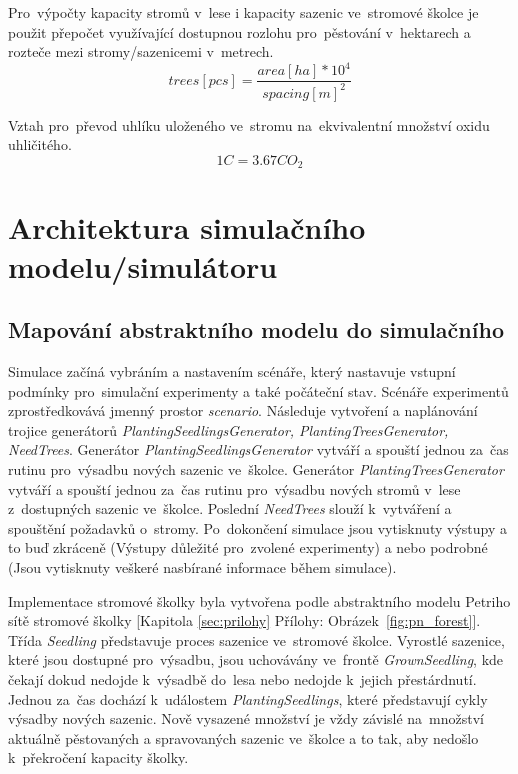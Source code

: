 \documentclass[a4paper, 11pt, titlepage]{article}
\begin{document}
Pro~výpočty kapacity stromů v~lese i kapacity sazenic ve~stromové školce je použit přepočet využívající dostupnou rozlohu pro~pěstování v~hektarech a rozteče mezi stromy/sazenicemi v~metrech.
$$trees[pcs]=\frac{area[ha]*10^4}{spacing[m]^2}$$

Vztah pro~převod uhlíku uloženého ve~stromu na~ekvivalentní množství oxidu uhličitého.\cite{Growing_Tree_in_UK}
$$1C=3.67CO_2$$

\newpage

\section{Architektura simulačního modelu/simulátoru} \label{sec:architektura_simulacniho_modelu_simulatoru}

\subsection{Mapování abstraktního modelu do simulačního\cite[snímek 36]{IMS_prez}}

Simulace začíná vybráním a nastavením scénáře, který nastavuje vstupní podmínky pro~simulační experimenty a také počáteční stav.
Scénáře experimentů zprostředkovává jmenný prostor \textit{scenario}.
Následuje vytvoření a naplánování trojice generátorů \textit{PlantingSeedlingsGenerator, PlantingTreesGenerator, NeedTrees}. 
Generátor \textit{PlantingSeedlingsGenerator} vytváří a spouští jednou za~čas rutinu pro~výsadbu nových sazenic ve~školce. 
Generátor \textit{PlantingTreesGenerator} vytváří a spouští jednou za~čas rutinu pro~výsadbu nových stromů v~lese z~dostupných sazenic ve~školce.
Poslední \textit{NeedTrees} slouží k~vytváření a spouštění požadavků o~stromy.
Po~dokončení simulace jsou vytisknuty výstupy a to buď zkráceně (Výstupy důležité pro~zvolené experimenty) a nebo podrobné (Jsou vytisknuty veškeré nasbírané informace během simulace).

Implementace stromové školky byla vytvořena podle abstraktního modelu Petriho sítě stromové školky [Kapitola \ref{sec:prilohy} Přílohy: Obrázek~\ref{fig:pn_forest}].
Třída \textit{Seedling} představuje proces sazenice ve~stromové školce. Vyrostlé sazenice, které jsou dostupné pro~výsadbu, jsou uchovávány ve~frontě \textit{GrownSeedling}, kde čekají dokud nedojde k~výsadbě do~lesa nebo nedojde k~jejich přestárdnutí. Jednou za~čas dochází k~událostem \textit{PlantingSeedlings}, které představují cykly výsadby nových sazenic. Nově vysazené množství je vždy závislé na~množství aktuálně pěstovaných a spravovaných sazenic ve~školce a to tak, aby nedošlo k~překročení kapacity školky.
\end{document}
